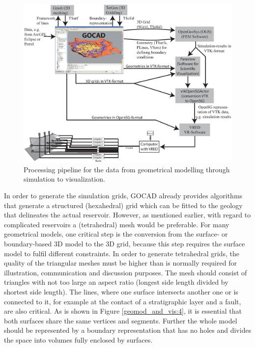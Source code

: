 \begin{figure}[tb]
\begin{center}
\includegraphics[width=0.99\linewidth]{figures/geomod_and_vis_fig_3}
\caption{Processing pipeline for the data from geometrical modelling through simulation to visualization.}
\label{geomod_and_vis:3}
\end{center}
\end{figure}

In order to generate the simulation grids, GOCAD already provides algorithms that generate a structured (hexahedral) grid which can be fitted to the geology that delineates the actual reservoir. However, as mentioned earlier, with regard to complicated reservoirs a (tetrahedral) mesh would be preferable. For many geometrical models, one critical step is the conversion from the surface- or boundary-based 3D model to the 3D grid, because this step requires the surface model to fulfil different constraints. In order to generate tetrahedral grids, the quality of the triangular meshes must be higher than is normally required for illustration, communication and discussion purposes. The mesh should consist of triangles with not too large an aspect ratio (longest side length divided by shortest side length). The lines, where one surface intersects another one or is connected to it, for example at the contact of a stratigraphic layer and a fault, are also critical. As is shown in Figure \ref{geomod_and_vis:4}, it is essential that both surfaces share the same vertices and segments. Further the whole model should be represented by a boundary representation that has no holes and divides the space into volumes fully enclosed by surfaces.

